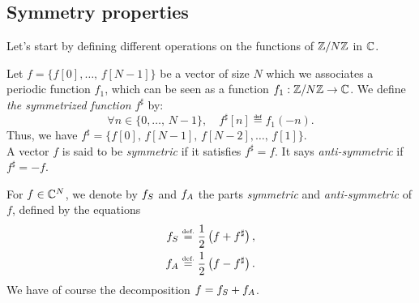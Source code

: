 \subsection{Symmetry properties}
\label{sect2-prop-symmetry} 
 
Let's start by defining different operations on the functions of $ \mathbb{Z}/N \mathbb{Z} $ in $ \mathbb{C} $.
 
\begin{defn}
\label{defn-symmetry-operator}
 \label{notation-48} Let $ f = \{f[0], \ldots, \, f[N-1]\} $ be a vector of size $N$ which we associates a periodic function $ f_1 $, which can be seen as a function $ f_1: \mathbb{Z}/N \mathbb{Z} \rightarrow \mathbb{C} $. We define \textit{the symmetrized function} $ f^\sharp $ by:
\begin{equation}
\label{eq-defn-symmetrical-sample}
\forall n \in \{0, \ldots, \, N-1\}, \quad f^\sharp [n] \eqdef f_1 (-n).
\end{equation}
Thus, we have $ f^\sharp = \{f[0], \, f[N-1], \, f[N-2], \ldots, \, f[1]\} $. \\A vector $ f $ is said to be \textit{symmetric} if it satisfies $ f^\sharp = f $. It says \textit{anti-symmetric} if $ f^\sharp = -f $.
\end{defn}
 
 
\begin{defn}[Decomposition]
\label{defn-parts-sym-anti-sym}
 \label{notation-49} For $ f \in \mathbb{C}^N $, we denote by $ {f}_S $ and $ {f}_A $ the parts \textit{symmetric} and \textit{anti-symmetric} of $ f $, defined by the equations
\begin{align*}
{f}_S & \stackrel{\mbox{\upshape\tiny def.}}{=} \frac{1}{2} \left(f + f^\sharp \right), \\
{f}_A & \stackrel{\mbox{\upshape\tiny def.}}{=} \frac{1}{2} \left(f - f^\sharp \right).
\end{align*}
We have of course the decomposition $ f = {f}_S + {f}_A $.
\end{defn}
 
